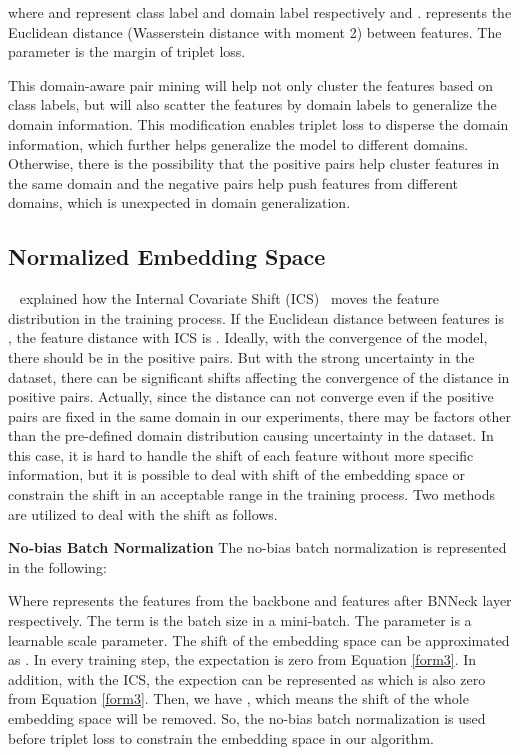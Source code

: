 \documentclass[a4paper,fleqn]{cas-dc}
\begin{document}
where  and  represent class label and domain label respectively and .  represents the Euclidean distance (Wasserstein distance with moment 2) between features. The parameter  is the margin of triplet loss. \par
This domain-aware pair mining will help not only cluster the features based on class labels, but will also scatter the features by domain labels to generalize the domain information. This modification enables triplet loss to disperse the domain information, which further helps generalize the model to different domains.  Otherwise, there is the possibility that the positive pairs help cluster features in the same domain and the negative pairs help push features from different domains, which is unexpected in domain generalization.  
 
\subsection{Normalized Embedding Space}
~\cite{batchnorm}  explained how the Internal Covariate Shift (ICS)~\cite{batchnorm} moves the feature distribution in the training process. If the Euclidean distance  between features  is , the feature distance with ICS is . Ideally, with the convergence of the model, there should be  in the positive pairs. But with the strong uncertainty in the dataset, there can be significant shifts affecting the convergence of the distance in positive pairs. Actually, since the distance can not converge even if the positive pairs are fixed in the same domain in our experiments, there may be factors other than the pre-defined domain distribution causing uncertainty in the dataset. In this case, it is hard to handle the shift of each feature without more specific information, but it is possible to deal with shift of the embedding space or constrain the shift in an acceptable range in the training process. Two methods are utilized to deal with the shift as follows. \par
\noindent \textbf{No-bias Batch Normalization} The no-bias batch normalization is represented in the following:

Where  represents the features from the backbone and features after BNNeck layer respectively. The term  is the batch size in a mini-batch. The parameter  is a learnable scale parameter. The shift of the embedding space can be approximated as .  In every training step, the expectation  is zero from Equation \ref{form3}. In addition, with the ICS, the expection can be represented as  which is also zero from Equation \ref{form3}. Then, we have , which means the shift of the whole embedding space will be removed. So,  the no-bias batch normalization is used before triplet loss to constrain the embedding space in our algorithm.
\end{document}
